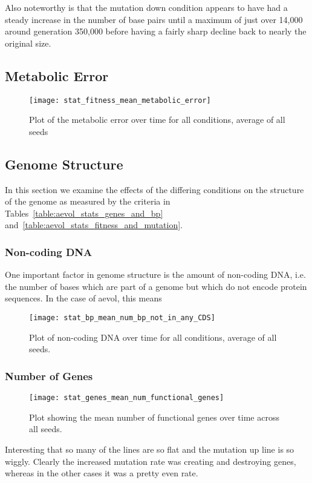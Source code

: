Also noteworthy is that the mutation down condition appears to have had a steady increase in the number of base pairs until a maximum of just over 14,000 around generation 350,000 before having a fairly sharp decline back to nearly the original size. 

\subsection{Metabolic Error}
\begin{figure}[H]
	\texttt{[image: stat\_fitness\_mean\_metabolic\_error]}
	\caption[Metabolic error]{Plot of the metabolic error over time for all conditions, average of all seeds}
	\label{fig:mean_metabolic_error}
\end{figure}
\subsection{Genome Structure}
In this section we examine the effects of the differing conditions on the structure of the genome as measured by the criteria in Tables~\ref{table:aevol_stats_genes_and_bp} and~\ref{table:aevol_stats_fitness_and_mutation}. 
\subsubsection{Non-coding DNA}
One important factor in genome structure is the amount of non-coding DNA, i.e. the number of bases which are part of a genome but which do not encode protein sequences. In the case of aevol, this means 
\begin{figure}[H]
	\centering
	\texttt{[image: stat\_bp\_mean\_num\_bp\_not\_in\_any\_CDS]}
	\caption[Non-coding DNA]{Plot of non-coding DNA over time for all conditions, average of all seeds.}
	\label{fig:mean_non-coding_DNA}
\end{figure}

\subsubsection{Number of Genes}
\begin{figure}[H]
	\centering
	\texttt{[image: stat\_genes\_mean\_num\_functional\_genes]}
	\caption[Mean number of functional genes]{Plot showing the mean number of functional genes over time across all seeds.}
	\label{fig:mean_num_functional_genes}
\end{figure}
Interesting that so many of the lines are so flat and the mutation up line is so wiggly. Clearly the increased mutation rate was creating and destroying genes, whereas in the other cases it was a pretty even rate. 
